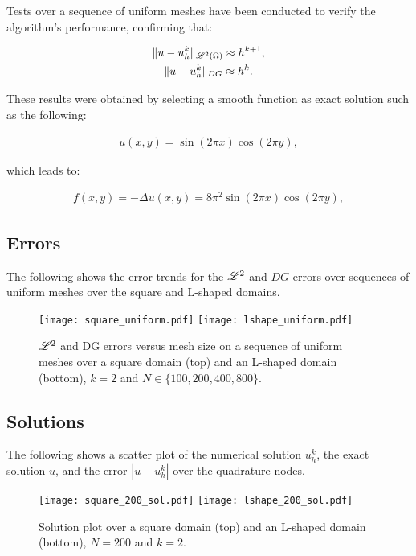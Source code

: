 Tests over a sequence of uniform meshes have been conducted to verify the algorithm's performance, confirming that:

\begin{gather}
    \lVert u - u^k_h \rVert_{\mathscr{L}^2(\Omega)} \approx h^{k + 1}, \\
    \lVert u - u^k_h \rVert_{DG} \approx h^k.
\end{gather}

These results were obtained by selecting a smooth function as exact solution such as the following:

\begin{gather}
    u(x, y) = \sin(2 \pi x) \cos(2 \pi y),
\end{gather}

which leads to:

\begin{gather}
    f(x, y) = -\Delta u(x, y) = 8 \pi^2 \sin(2 \pi x) \cos(2 \pi y),
\end{gather}

\newpage
\subsection{Errors}

The following shows the error trends for the $\mathscr{L}^2$ and $DG$ errors over sequences of uniform meshes over the square and L-shaped domains.

\begin{figure}[!ht]
	\centering
	\texttt{[image: square\_uniform.pdf]}
    \texttt{[image: lshape\_uniform.pdf]}
	\caption{$\mathscr{L}^2$ and DG errors versus mesh size on a sequence of uniform meshes over a square domain (top) and an L-shaped domain (bottom), $k = 2$ and $N \in \{100, 200, 400, 800\}$.}
\end{figure}

\newpage
\subsection{Solutions}

The following shows a scatter plot of the numerical solution $u^k_h$, the exact solution $u$, and the error $|u - u^k_h|$ over the quadrature nodes.

\begin{figure}[!ht]
	\centering
	\texttt{[image: square\_200\_sol.pdf]}
    \texttt{[image: lshape\_200\_sol.pdf]}
	\caption{Solution plot over a square domain (top) and an L-shaped domain (bottom), $N = 200$ and $k = 2$.}
\end{figure}